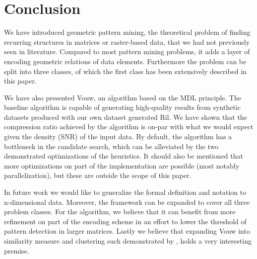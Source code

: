 \documentclass{llncs}
\begin{document}
\section{Conclusion}

We have introduced geometric pattern mining, the theoretical problem of finding recurring structures in matrices or raster-based data, that we had not previously seen in literature. Compared to most pattern mining problems, it adds a layer of encoding geometric relations of data elements. Furthermore the problem can be split into three classes, of which the first class has been extensively described in this paper.

We have also presented Vouw, an algorithm based on the MDL principle. The baseline algorithm is capable of generating high-quality results from synthetic datasets produced with our own dataset generated Ril. We have shown that the compression ratio achieved by the algorithm is on-par with what we would expect given the density (SNR) of the input data. By default, the algorithm has a bottleneck in the candidate search, which can be alleviated by the two demonstrated optimizations of the heuristics. It should also be mentioned that more optimizations on part of the implementation are possible (most notably parallelization), but these are outside the scope of this paper.

In future work we would like to generalize the formal definition and notation to n-dimensional data. Moreover, the framework can be expanded to cover all three problem classes. For the algorithm, we believe that it can benefit from more refinement on part of the encoding scheme in an effort to lower the threshold of pattern detection in larger matrices. Lastly we believe that expanding Vouw into similarity measure and clustering such demonstrated by \cite{campana2010compression}, holds a very interesting premise.
\end{document}
